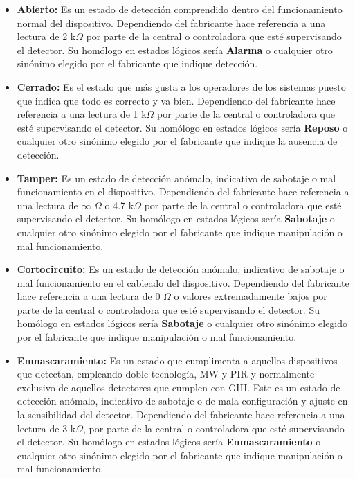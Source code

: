 \begin{itemize}
\item \textbf{Abierto:} Es un estado de detección comprendido dentro del funcionamiento normal del dispositivo. Dependiendo del fabricante hace referencia a una lectura de 2 k$\Omega$ por parte de la central o controladora que esté supervisando el detector. Su homólogo en estados lógicos sería \textbf{Alarma} o cualquier otro sinónimo elegido por el fabricante que indique detección.
\item \textbf{Cerrado:} Es el estado que más gusta a los operadores de los sistemas puesto que indica que todo es correcto y va bien. Dependiendo del fabricante hace referencia a una lectura de 1 k$\Omega$ por parte de la central o controladora que esté supervisando el detector. Su homólogo en estados lógicos sería \textbf{Reposo} o cualquier otro sinónimo elegido por el fabricante que indique la ausencia de detección.
\item \textbf{Tamper:} Es un estado de detección anómalo, indicativo de sabotaje o mal funcionamiento en el dispositivo. Dependiendo del fabricante hace referencia a una lectura de $\infty$ $\Omega$ o 4.7 k$\Omega$ por parte de la central o controladora que esté supervisando el detector. Su homólogo en estados lógicos sería \textbf{Sabotaje} o cualquier otro sinónimo elegido por el fabricante que indique manipulación o mal funcionamiento.
\item \textbf{Cortocircuito:} Es un estado de detección anómalo, indicativo de sabotaje o mal funcionamiento en el cableado del dispositivo. Dependiendo del fabricante hace referencia a una lectura de 0 $\Omega$ o valores extremadamente bajos por parte de la central o controladora que esté supervisando el detector. Su homólogo en estados lógicos sería \textbf{Sabotaje} o cualquier otro sinónimo elegido por el fabricante que indique manipulación o mal funcionamiento.
\item  \textbf{Enmascaramiento:}  Es  un   estado  que  cumplimenta  a
  aquellos  dispositivos  que  detectan, empleando  doble  tecnología,
  \acf{MW} y \acf{PIR} y  normalmente exclusivo de aquellos detectores
  que cumplen con \acs{GIII}. Este  es un estado de detección anómalo,
  indicativo  de sabotaje  o  de  mala configuración  y  ajuste en  la
  sensibilidad   del  detector.   Dependiendo   del  fabricante   hace
  referencia a  una lectura de 3  k$\Omega$, por parte de  la central o
  controladora  que  esté supervisando  el  detector.  Su homólogo  en
  estados  lógicos  sería  \textbf{Enmascaramiento} o  cualquier  otro
  sinónimo elegido  por el fabricante  que indique manipulación  o mal
  funcionamiento.
\end{itemize}

